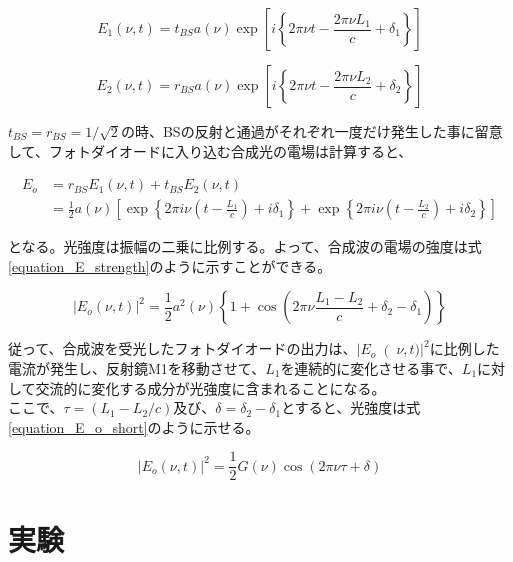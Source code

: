 \documentclass[uplatex, titlepage, fontsize=10pt, paper=a4paper]{jsarticle}
\numberwithin{equation}{section}
\begin{document}
\begin{equation}
    E_{1}(\nu, t) = t_{BS}a(\nu)\exp\left[i\left\{{2{\pi\nu}t-{\frac{2{\pi\nu}L_1}{c}}+\delta_1}\right\}\right] 
    \label{equation_E_M1}
\end{equation}

\begin{equation}
    E_{2}(\nu, t) = r_{BS}a(\nu)\exp\left[i\left\{{2{\pi\nu}t-{\frac{2{\pi\nu}L_2}{c}}+\delta_2}\right\}\right] 
    \label{equation_E_M2}
\end{equation}

$t_{BS}=r_{BS}=1/\sqrt{2}$の時、BSの反射と通過がそれぞれ一度だけ発生した事に留意して、フォトダイオードに入り込む合成光の電場は計算すると、

\begin{equation}
    \begin{split}
    E_{o}&=r_{BS}E_{1}(\nu,t)+t_{BS}E_{2}(\nu,t)\\
    &=\frac{1}{2}a(\nu)\left[\exp \left\{2\pi{i\nu}\left(t-\frac{L_1}{c}\right)+i\delta_1 \right\}+\exp \left\{2\pi{i\nu}\left(t-\frac{L_2}{c}\right)+i\delta_2 \right\} \right] 
    \label{equation_E_o}
    \end{split}
\end{equation}

となる。光強度は振幅の二乗に比例する。よって、合成波の電場の強度は式\ref{equation_E_strength}のように示すことができる。

\begin{equation}
    {\left\lvert E_{o}(\nu, t)\right\rvert} ^2 = \frac{1}{2}a^{2}(\nu)\left\{1+\cos\left(2\pi\nu\frac{L_{1}-L_{2}}{c}+\delta_{2}-\delta_{1}\right) \right\} 
    \label{equation_E_strength}
\end{equation}

従って、合成波を受光したフォトダイオードの出力は、${\left\lvert E_{o}\right(\nu,t)\rvert}^2$に比例した電流が発生し、反射鏡M1を移動させて、$L_{1}$を連続的に変化させる事で、$L_{1}$に対して交流的に変化する成分が光強度に含まれることになる。\\
ここで、$\tau=(L_{1}-L_{2}/c)$及び、$\delta=\delta_{2}-\delta_{1}$とすると、光強度は式\ref{equation_E_o_short}のように示せる。

\begin{equation}
    {\left\lvert E_{o}(\nu,t)\right\rvert}^2=\frac{1}{2}G(\nu)\cos(2\pi\nu\tau+\delta)
    \label{equation_E_o_short}
\end{equation}

\section{実験}
\end{document}
